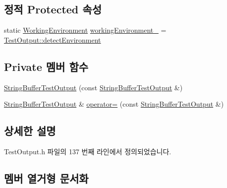 \subsection*{정적 Protected 속성}
\begin{DoxyCompactItemize}
\item 
static \hyperlink{class_test_output_a0541851f863713454486a9fb3080f766}{Working\+Environment} \hyperlink{class_test_output_a8b622cfce4b95599cd31b61a777d68ef}{working\+Environment\+\_\+} = \hyperlink{class_test_output_a0541851f863713454486a9fb3080f766a3f11f791db94db142e33c3c75442ed10}{Test\+Output\+::detect\+Environment}
\end{DoxyCompactItemize}
\subsection*{Private 멤버 함수}
\begin{DoxyCompactItemize}
\item 
\hyperlink{class_string_buffer_test_output_a3ef927442a1fcad413453dd0d4408743}{String\+Buffer\+Test\+Output} (const \hyperlink{class_string_buffer_test_output}{String\+Buffer\+Test\+Output} \&)
\item 
\hyperlink{class_string_buffer_test_output}{String\+Buffer\+Test\+Output} \& \hyperlink{class_string_buffer_test_output_ad5f409d3f35233befdbdf5dcd9dd9840}{operator=} (const \hyperlink{class_string_buffer_test_output}{String\+Buffer\+Test\+Output} \&)
\end{DoxyCompactItemize}


\subsection{상세한 설명}


Test\+Output.\+h 파일의 137 번째 라인에서 정의되었습니다.



\subsection{멤버 열거형 문서화}
